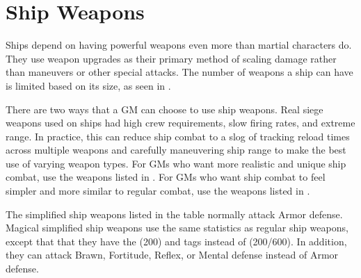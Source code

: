 
\section{Ship Weapons}\label{Ship Weapons}
  Ships depend on having powerful weapons even more than martial characters do.
  They use weapon upgrades as their primary method of scaling damage rather than maneuvers or other special attacks.
  The number of weapons a ship can have is limited based on its size, as seen in .

  There are two ways that a GM can choose to use ship weapons.
  Real siege weapons used on ships had high crew requirements, slow firing rates, and extreme range.
  In practice, this can reduce ship combat to a slog of tracking reload times across multiple weapons and carefully maneuvering ship range to make the best use of varying weapon types.
  For GMs who want more realistic and unique ship combat, use the weapons listed in .
  For GMs who want ship combat to feel simpler and more similar to regular combat, use the weapons listed in .

  The simplified ship weapons listed in the table normally attack Armor defense.
  Magical simplified ship weapons use the same statistics as regular ship weapons, except that that they have the  (200) and  tags instead of  (200/600).
  In addition, they can attack Brawn, Fortitude, Reflex, or Mental defense instead of Armor defense.

